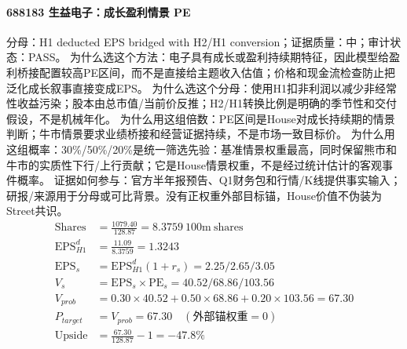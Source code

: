 \paragraph{688183 生益电子：成长盈利情景 PE}
分母：H1 deducted EPS bridged with H2/H1 conversion；证据质量：中；审计状态：PASS。
为什么选这个方法：电子具有成长或盈利持续期特征，因此模型给盈利桥接配置较高PE区间，而不是直接给主题收入估值；价格和现金流检查防止把泛化成长叙事直接变成EPS。
为什么选这个分母：使用H1扣非利润以减少非经常性收益污染；股本由总市值/当前价反推；H2/H1转换比例是明确的季节性和交付假设，不是机械年化。
为什么用这组倍数：PE区间是House对成长持续期的情景判断；牛市情景要求业绩桥接和经营证据持续，不是市场一致目标价。
为什么用这组概率：30\%/50\%/20\%是统一筛选先验：基准情景权重最高，同时保留熊市和牛市的实质性下行/上行贡献；它是House情景权重，不是经过统计估计的客观事件概率。
证据如何参与：官方半年报预告、Q1财务包和行情/K线提供事实输入；研报/来源用于分母或可比背景。没有正权重外部目标锚，House价值不伪装为Street共识。
\begin{align*}
\mathrm{Shares} &= \frac{1079.40}{128.87}=8.3759\ \mathrm{100m\ shares}\\
\mathrm{EPS}_{H1}^d &= \frac{11.09}{8.3759}=1.3243\\
\mathrm{EPS}_s &= \mathrm{EPS}_{H1}^d(1+r_s)=2.25/2.65/3.05\\
V_s &= \mathrm{EPS}_s\times \mathrm{PE}_s=40.52/68.86/103.56\\
V_{prob} &= 0.30\times 40.52+0.50\times 68.86+0.20\times 103.56=67.30\\
P_{target} &= V_{prob}=67.30\quad(\text{外部锚权重}=0)\\
\mathrm{Upside} &= \frac{67.30}{128.87}-1=-47.8\%\\
\end{align*}

